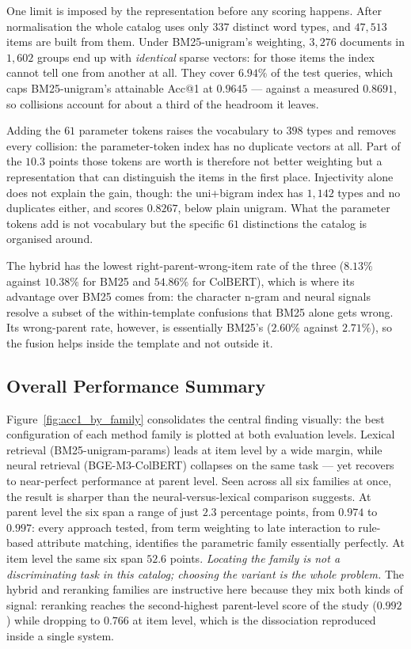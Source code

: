 \documentclass[preprint,12pt]{elsarticle}
\begin{document}
One limit is imposed by the representation before any scoring happens. After normalisation the whole catalog uses only $337$ distinct word types, and $47{,}513$ items are built from them. Under BM25-unigram's weighting, $3{,}276$ documents in $1{,}602$ groups end up with \emph{identical} sparse vectors: for those items the index cannot tell one from another at all. They cover $6.94\%$ of the test queries, which caps BM25-unigram's attainable Acc@1 at $0.9645$ --- against a measured $0.8691$, so collisions account for about a third of the headroom it leaves.

Adding the $61$ parameter tokens raises the vocabulary to $398$ types and removes every collision: the parameter-token index has no duplicate vectors at all. Part of the $10.3$ points those tokens are worth is therefore not better weighting but a representation that can distinguish the items in the first place. Injectivity alone does not explain the gain, though: the uni+bigram index has $1{,}142$ types and no duplicates either, and scores $0.8267$, below plain unigram. What the parameter tokens add is not vocabulary but the specific $61$ distinctions the catalog is organised around.

The hybrid has the lowest right-parent-wrong-item rate of the three ($8.13\%$ against $10.38\%$ for BM25 and $54.86\%$ for ColBERT), which is where its advantage over BM25 comes from: the character n-gram and neural signals resolve a subset of the within-template confusions that BM25 alone gets wrong. Its wrong-parent rate, however, is essentially BM25's ($2.60\%$ against $2.71\%$), so the fusion helps inside the template and not outside it.

\subsection{Overall Performance Summary}
\label{sec:4.7_Overall Performance Summary}

Figure~\ref{fig:acc1_by_family} consolidates the central finding visually: the best configuration of each method family is plotted at both evaluation levels. Lexical retrieval (BM25-unigram-params) leads at item level by a wide margin, while neural retrieval (BGE-M3-ColBERT) collapses on the same task --- yet recovers to near-perfect performance at parent level. Seen across all six families at once, the result is sharper than the neural-versus-lexical comparison suggests. At parent level the six span a range of just $2.3$ percentage points, from $0.974$ to $0.997$: every approach tested, from term weighting to late interaction to rule-based attribute matching, identifies the parametric family essentially perfectly. At item level the same six span $52.6$ points. \emph{Locating the family is not a discriminating task in this catalog; choosing the variant is the whole problem.} The hybrid and reranking families are instructive here because they mix both kinds of signal: reranking reaches the second-highest parent-level score of the study ($0.992$) while dropping to $0.766$ at item level, which is the dissociation reproduced inside a single system.
\end{document}
